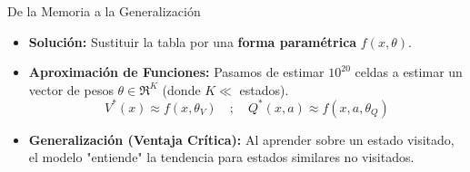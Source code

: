 \documentclass[xcolor=dvipsnames, handout]{beamer}
\begin{document}
\begin{frame}{De la Memoria a la Generalizaci\'on}
\begin{itemize}
    \item \textbf{Soluci\'on:} Sustituir la tabla por una \textbf{forma param\'etrica} $f(x, \theta)$.
    \item \textbf{Aproximaci\'on de Funciones:} 
    Pasamos de estimar $10^{20}$ celdas a estimar un vector de pesos $\theta \in \Re^K$ (donde $K \ll$ estados).
    \[ V^*(x) \approx f(x,\theta_V) \quad ; \quad Q^*(x,a) \approx f(x, a, \theta_Q) \]
    
    \item<2-> \textbf{Generalizaci\'on (Ventaja Cr\'itica):} 
    Al aprender sobre un estado visitado, el modelo "entiende" la tendencia para estados similares no visitados.
\end{itemize}


\end{frame}
\end{document}
